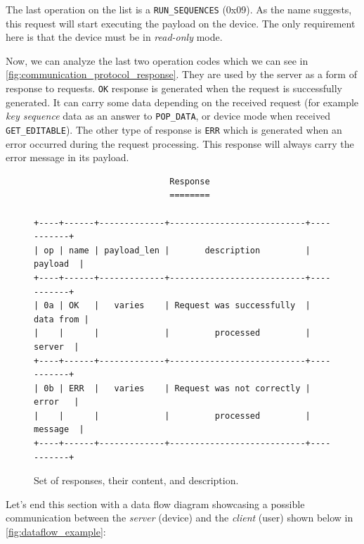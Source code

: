 The last operation on the list is a \verb|RUN_SEQUENCES| (0x09). As the name suggests, this request will start executing the payload on the device. The only requirement here is that the device must be in \emph{read-only} mode.

Now, we can analyze the last two operation codes which we can see in \autoref{fig:communication_protocol_response}. They are used by the server as a form of response to requests. \verb|OK| response is generated when the request is successfully generated. It can carry some data depending on the received request (for example \emph{key sequence} data as an answer to \verb|POP_DATA|, or device mode when received \verb|GET_EDITABLE|). The other type of response is \verb|ERR| which is generated when an error occurred during the request processing. This response will always carry the error message in its payload.

\begin{figure}[ht]
\label{fig:communication_protocol_response}
\centering
\begin{varwidth}{\linewidth}
\begin{verbatim}
                           Response
                           ========

+----+------+-------------+---------------------------+-----------+
| op | name | payload_len |       description         |  payload  |
+----+------+-------------+---------------------------+-----------+
| 0a | OK   |   varies    | Request was successfully  | data from |
|    |      |             |         processed         |   server  |
+----+------+-------------+---------------------------+-----------+
| 0b | ERR  |   varies    | Request was not correctly |   error   |
|    |      |             |         processed         |  message  |
+----+------+-------------+---------------------------+-----------+
\end{verbatim}
\end{varwidth}
\caption{Set of responses, their content, and description.}
\end{figure}

Let's end this section with a data flow diagram showcasing a possible communication between the \emph{server} (device) and the \emph{client} (user) shown below in \autoref{fig:dataflow_example}: 


